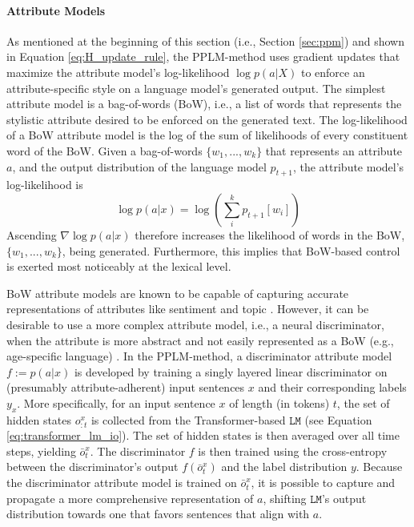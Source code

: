 \paragraph{Attribute Models} As mentioned at the beginning of this section (i.e., Section \ref{sec:ppm}) and shown in Equation \ref{eq:H_update_rule}, the PPLM-method uses gradient updates that maximize the attribute model's log-likelihood $\log p(a | X)$ to enforce an attribute-specific style on a language model's generated output.
The simplest attribute model is a bag-of-words (BoW), i.e., a list of words that represents the stylistic attribute desired to be enforced on the generated text.
The log-likelihood of a BoW attribute model is the log of the sum of likelihoods of every constituent word of the BoW.
Given a bag-of-words $\{w_1, ..., w_k\}$ that represents an attribute $a$, and the output distribution of the language model $p_{t + 1}$, the attribute model's log-likelihood is
\begin{equation}
    \log p(a | x) = \log \left( \sum_{i}^{k} p_{t + 1} [w_i] \right)
    \label{eq:bow_att_model_loglikelihood}
\end{equation}
Ascending $\nabla \log p(a | x)$ therefore increases the likelihood of words in the BoW, $\{w_1, ..., w_k\}$, being generated. Furthermore, this implies that BoW-based control is exerted most noticeably at the lexical level.

BoW attribute models are known to be capable of capturing accurate representations of attributes like sentiment and topic \citep{li-etal-2018-delete}.
However, it can be desirable to use a more complex attribute model, i.e., a neural discriminator, when the attribute is more abstract and not easily represented as a BoW (e.g., age-specific language) \citep{dathathri2019plug}.
In the PPLM-method, a discriminator attribute model $f := p(a | x)$ is developed by training a singly layered linear discriminator on (presumably attribute-adherent) input sentences $x$ and their corresponding labels $y_x$. More specifically, for an input sentence $x$ of length (in tokens) $t$, the set of hidden states $o_{:t}^{x}$ is collected from the Transformer-based $\texttt{LM}$ (see Equation \ref{eq:transformer_lm_io}).
The set of hidden states is then averaged over all time steps, yielding $\bar{o}_t^x$.
The discriminator $f$ is then trained using the cross-entropy between the discriminator's output $f(\bar{o}_t^x)$ and the label distribution $y$. Because the discriminator attribute model is trained on $\bar{o}_t^x$, it is possible to capture and propagate a more comprehensive representation of $a$, shifting $\texttt{LM}$'s output distribution towards one that favors sentences that align with $a$.

